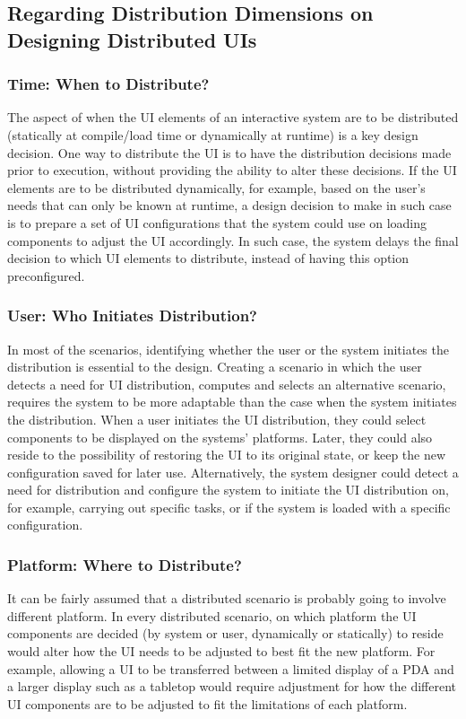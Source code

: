 \subsection{Regarding Distribution Dimensions on Designing Distributed UIs} 
\subsubsection{Time: When to Distribute?}
The aspect of when the UI elements of an interactive system are to be distributed (statically at compile/load time or dynamically at runtime) is a key design decision. One way to distribute the UI is to have the distribution decisions made prior to execution, without providing the ability to alter these decisions. If the UI elements are to be distributed dynamically, for example, based on the user's needs that can only be known at runtime, a design decision to make in such case is to prepare a set of UI configurations that the system could use on loading components to adjust the UI accordingly. In such case, the system delays the final decision to which UI elements to distribute, instead of having this option preconfigured.    

\subsubsection{User: Who Initiates Distribution?}
In most of the scenarios, identifying whether the user or the system initiates the distribution is essential to the design. Creating a scenario in which the user detects a need for UI distribution, computes and selects an alternative scenario, requires the system to be more adaptable than the case when the system initiates the distribution. When a user initiates the UI distribution, they could select components to be displayed on the systems' platforms. Later, they could also reside to the possibility of restoring the UI to its original state, or keep the new configuration saved for later use. Alternatively, the system designer could detect a need for distribution and configure the system to initiate the UI distribution on, for example, carrying out specific tasks, or if the system is loaded with a specific configuration.    
 
\subsubsection{Platform: Where to Distribute?}
It can be fairly assumed that a distributed scenario is probably going to involve different platform. In every distributed scenario, on which platform the UI components are decided (by system or user, dynamically or statically) to reside would alter how the UI needs to be adjusted to best fit the new platform. For example, allowing a UI to be transferred between a limited display of a PDA and a larger display such as a tabletop would require adjustment for how the different UI components are to be adjusted to fit the limitations of each platform.   

